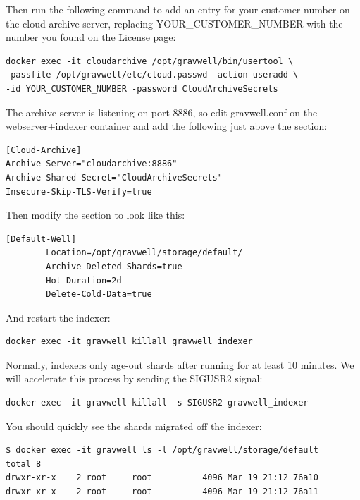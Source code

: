 Then run the following command to add an entry for your customer number
on the cloud archive server, replacing YOUR\_CUSTOMER\_NUMBER with the
number you found on the License page:

\begin{Verbatim}[breaklines=true]
docker exec -it cloudarchive /opt/gravwell/bin/usertool \
-passfile /opt/gravwell/etc/cloud.passwd -action useradd \
-id YOUR_CUSTOMER_NUMBER -password CloudArchiveSecrets
\end{Verbatim}

The archive server is listening on port 8886, so edit gravwell.conf on
the webserver+indexer container and add the following just above the
\code{[Default-Well]} section:

\begin{Verbatim}[breaklines=true]
[Cloud-Archive]
Archive-Server="cloudarchive:8886"
Archive-Shared-Secret="CloudArchiveSecrets"
Insecure-Skip-TLS-Verify=true
\end{Verbatim}

Then modify the  section to look like this:

\begin{Verbatim}[breaklines=true]
[Default-Well]
        Location=/opt/gravwell/storage/default/
        Archive-Deleted-Shards=true
        Hot-Duration=2d
        Delete-Cold-Data=true
\end{Verbatim}

And restart the indexer:

\begin{Verbatim}[breaklines=true]
docker exec -it gravwell killall gravwell_indexer
\end{Verbatim}

Normally, indexers only age-out shards after running for at least 10
minutes. We will accelerate this process by sending the SIGUSR2 signal:

\begin{Verbatim}[breaklines=true]
docker exec -it gravwell killall -s SIGUSR2 gravwell_indexer
\end{Verbatim}

You should quickly see the shards migrated off the indexer:

\begin{Verbatim}[breaklines=true]
$ docker exec -it gravwell ls -l /opt/gravwell/storage/default
total 8
drwxr-xr-x    2 root     root          4096 Mar 19 21:12 76a10
drwxr-xr-x    2 root     root          4096 Mar 19 21:12 76a11
\end{Verbatim}

